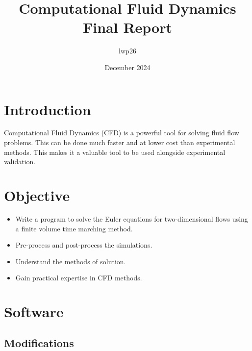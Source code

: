 \documentclass{article}
\begin{document}
\title{Computational Fluid Dynamics \\
    \large Final Report}
\author{lwp26}
\date{December 2024}
\maketitle 

\section{Introduction}

Computational Fluid Dynamics (CFD) is a powerful tool for solving fluid flow problems.
This can be done much faster and at lower cost than experimental methods.
This makes it a valuable tool to be used alongside experimental validation.


\section{Objective}


\begin{itemize}
    \item Write a program to solve the Euler equations for two-dimensional flows using a finite volume time marching method.
    \item Pre-process and post-process the simulations.
    \item Understand the methods of solution.
    \item Gain practical expertise in CFD methods.
\end{itemize}

\section{Software}
\subsection{Modifications}
\end{document}
